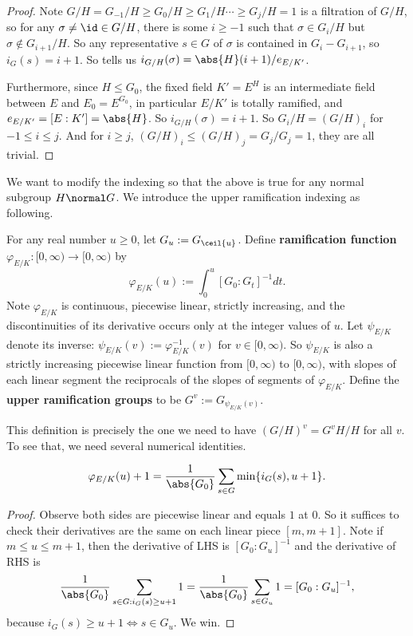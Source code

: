 \documentclass[11pt]{amsart}
\begin{document}
\begin{proof}
    Note $G/H = G_{-1}/H \geq G_0/H \geq G_1/H \cdots \geq G_j/H = 1$ is a
    filtration of $G/H$, so for any $\sigma \neq \id \in G/H$, there is some $i
    \geq -1$ such that $\sigma \in G_i/H$ but $\sigma \not\in G_{i+1}/H$.  So
    any representative $s \in G$ of $\sigma$ is contained in $G_i - G_{i+1}$, so
    $i_G(s) = i+1$.  So  tells us $i_{G/H}(\sigma) =
    \abs{H} (i+1) / e_{E/K'}$.

    Furthermore, since $H \leq G_0$, the fixed field $K' = E^H$ is an
    intermediate field between $E$ and $E_0 = E^{G_0}$, in particular $E/K'$ is
    totally ramified, and $e_{E/K'} = [E : K'] = \abs{H}$.  So $i_{G/H}(\sigma)
    = i+1$.  So $G_i/H = (G/H)_i$ for $-1 \leq i \leq j$.  And for $i \geq j$,
    $(G/H)_i \leq (G/H)_j = G_j/G_j = 1$, they are all trivial.
\end{proof}

We want to modify the indexing so that the above is true for any normal subgroup
$H \normal G$.  We introduce the upper ramification indexing as following.

For any real number $u \geq 0$, let $G_u := G_{\ceil{u}}$.  Define {\bf
    ramification function}  $\varphi_{E/K} : [0,
\infty) \to [0, \infty)$ by
\[
    \varphi_{E/K}(u) := \int_{0}^{u} [G_0 : G_t]^{-1} dt.
\]
Note $\varphi_{E/K}$ is continuous, piecewise linear, strictly increasing, and
the discontinuities of its derivative occurs only at the integer values of $u$.
Let $\psi_{E/K}$ denote its inverse: $\psi_{E/K}(v) := \varphi_{E/K}^{-1}(v)$
for $v \in [0, \infty)$.  So $\psi_{E/K}$ is also a strictly increasing
piecewise linear function from $[0, \infty)$ to $[0, \infty)$, with slopes of
each linear segment the reciprocals of the slopes of segments of
$\varphi_{E/K}$. Define the {\bf upper ramification groups}  to be $G^{v} := G_{\psi_{E/K}(v)}$.

This definition is precisely the one we need to have $(G/H)^v = G^v H/H$ for all
$v$.  To see that, we need several numerical identities.

\begin{lem}
    \label{lem:phi_EK}
    \[
        \varphi_{E/K}(u) + 1 = \frac{1}{\abs{G_0}} \sum_{s \in G} \min \{i_G(s),
        u + 1\}.
    \]
\end{lem}

\begin{proof}
    Observe both sides are piecewise linear and equals $1$ at $0$.  So it
    suffices to check their derivatives are the same on each linear piece $[m,
    m+1]$.  Note if $m \leq u \leq m +1$, then the derivative of LHS is $[G_0 :
    G_u]^{-1}$ and the derivative of RHS is
    \[
        \frac{1}{\abs{G_0}} \sum_{s \in G : i_G(s) \geq u+1} 1
        = \frac{1}{\abs{G_0}} \sum_{s \in G_u} 1
        = [G_0 : G_u]^{-1},
    \]
    because $i_G(s) \geq u+1 \iff s \in G_u$.  We win.
\end{proof}
\end{document}
